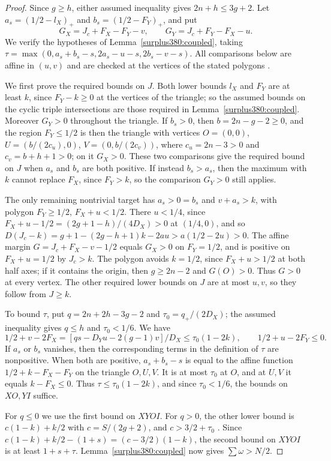 \begin{proof}
Since $g\ge h$, either assumed inequality gives $2n+h\le3g+2$.
Let
$a_s=(1/2-l_X)_+$ and $b_s=(1/2-F_Y)_+$, and put
\[
 G_X=J_c+F_X-F_Y-v,\qquad G_Y=J_c+F_Y-F_X-u.
\]
We verify the hypotheses of Lemma~\ref{surplus380:coupled},
taking $\tau=\max(0,a_s+b_s-s,2a_s-u-s,2b_s-v-s)$.
All comparisons below are affine in $(u,v)$ and are checked at the
vertices of the stated polygons .

We first prove the required bounds on $J$. Both lower bounds $l_X$ and $F_Y$
are at least $k$, since $F_Y-k\ge0$ at the vertices of the triangle; so
the assumed bounds on the cyclic triple intersections are those required in Lemma~\ref{surplus380:coupled}.
Moreover $G_Y>0$ throughout the triangle. If $b_s>0$, then
$b=2n-g-2\ge0$, and the region $F_Y\le1/2$ is then the triangle with
vertices $O=(0,0)$, $U=(b/(2c_u),0)$, $V=(0,b/(2c_v))$, where
$c_u=2n-3>0$ and $c_v=b+h+1>0$; on it $G_X>0$.
These two comparisons give the required bound on $J$
when $a_s$ and $b_s$ are both positive. If instead $b_s>a_s$, then the
maximum with $k$ cannot replace $F_X$, since $F_Y>k$, so the
comparison $G_Y>0$ still applies.

The only remaining nontrivial target has
$a_s>0=b_s$ and $v+a_s>k$, with polygon $F_Y\ge1/2$, $F_X+u<1/2$.
There $u<1/4$, since $F_X+u-1/2=(2g+1-h)/(4D_X)>0$ at $(1/4,0)$, and so
$D(J_c-k)=g+1-(2g-h+1)k-2au>a(1/2-2u)>0$. The affine margin
$G=J_c+F_X-v-1/2$ equals $G_X>0$ on $F_Y=1/2$, and is positive on
$F_X+u=1/2$ by $J_c>k$. The polygon avoids $k=1/2$, since $F_X+u>1/2$
at both half axes; if it contains the origin, then $g\ge2n-2$ and
$G(O)>0$. Thus $G>0$ at every vertex. The other required lower bounds
on $J$ are at most $u,v$, so they follow from $J\ge k$.

To bound $\tau$, put $q=2n+2h-3g-2$ and $\tau_0=q_+/(2D_X)$; the assumed
inequality gives $q\le h$ and $\tau_0<1/6$. We have
\[
 1/2+v-2F_X=[qs-D_Yu-2(g-1)v]/D_X\le\tau_0(1-2k),
 \qquad 1/2+u-2F_Y\le0.
\]
If $a_s$ or $b_s$ vanishes, then the corresponding
terms in the definition of $\tau$ are nonpositive.
When both are positive, $a_s+b_s-s$ is equal to the affine function
$1/2+k-F_X-F_Y$ on the triangle $O,U,V$. It is at most $\tau_0$ at $O$,
and at $U,V$ it equals $k-F_X\le0$.
Thus $\tau\le\tau_0(1-2k)$, and since $\tau_0<1/6$, the bounds on
$XO,YI$ suffice.

For $q\le0$ we use the first bound on $XYOI$.
For $q>0$, the other lower bound is $c(1-k)+k/2$
with $c=S/(2g+2)$, and $c>3/2+\tau_0$ .
Since $c(1-k)+k/2-(1+s)=(c-3/2)(1-k)$,
the second bound on $XYOI$ is at least $1+s+\tau$.
Lemma~\ref{surplus380:coupled} now gives $\sum\omega>N/2$.
\end{proof}

